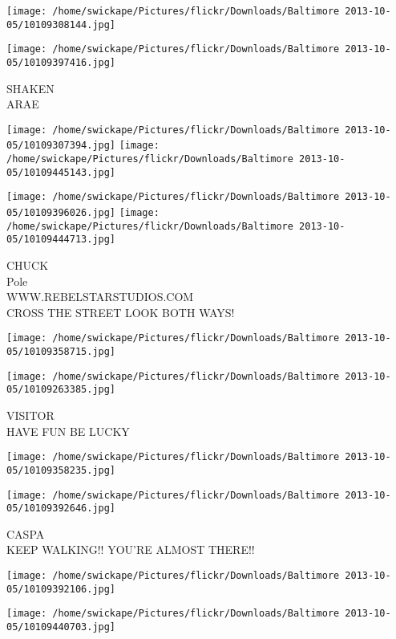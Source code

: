 \documentclass[10pt,letterpaper]{article}
\begin{document}
\texttt{[image: /home/swickape/Pictures/flickr/Downloads/Baltimore 2013-10-05/10109308144.jpg]}

\vspace{0.25in}
\texttt{[image: /home/swickape/Pictures/flickr/Downloads/Baltimore 2013-10-05/10109397416.jpg]}

SHAKEN\\
ARAE
\pagebreak

\texttt{[image: /home/swickape/Pictures/flickr/Downloads/Baltimore 2013-10-05/10109307394.jpg]}
\texttt{[image: /home/swickape/Pictures/flickr/Downloads/Baltimore 2013-10-05/10109445143.jpg]}

\texttt{[image: /home/swickape/Pictures/flickr/Downloads/Baltimore 2013-10-05/10109396026.jpg]}
\texttt{[image: /home/swickape/Pictures/flickr/Downloads/Baltimore 2013-10-05/10109444713.jpg]}

CHUCK\\
Pole\\
WWW.REBELSTARSTUDIOS.COM\\
CROSS THE STREET LOOK BOTH WAYS!
\pagebreak

\texttt{[image: /home/swickape/Pictures/flickr/Downloads/Baltimore 2013-10-05/10109358715.jpg]}

\vspace{0.25in}
\texttt{[image: /home/swickape/Pictures/flickr/Downloads/Baltimore 2013-10-05/10109263385.jpg]}

VISITOR\\
HAVE FUN BE LUCKY
\pagebreak

\texttt{[image: /home/swickape/Pictures/flickr/Downloads/Baltimore 2013-10-05/10109358235.jpg]}

\vspace{0.25in}
\texttt{[image: /home/swickape/Pictures/flickr/Downloads/Baltimore 2013-10-05/10109392646.jpg]}

CASPA\\
KEEP WALKING!! YOU'RE ALMOST THERE!!
\pagebreak

\texttt{[image: /home/swickape/Pictures/flickr/Downloads/Baltimore 2013-10-05/10109392106.jpg]}

\vspace{0.25in}
\texttt{[image: /home/swickape/Pictures/flickr/Downloads/Baltimore 2013-10-05/10109440703.jpg]}
\end{document}
